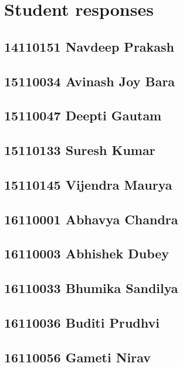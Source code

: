 \documentclass[journal=jpcbfk,manuscript=article]{achemso}
\begin{document}
\section{Student responses}

\subsection {14110151	Navdeep Prakash}

\subsection {15110034	Avinash Joy Bara}

\subsection {15110047	Deepti Gautam}

\subsection {15110133	Suresh Kumar}

\subsection {15110145	Vijendra Maurya}

\subsection {16110001	Abhavya Chandra}

\subsection {16110003	Abhishek Dubey}

\subsection {16110033	Bhumika Sandilya}

\subsection {16110036	Buditi Prudhvi}

\subsection {16110056	Gameti Nirav}
\end{document}
